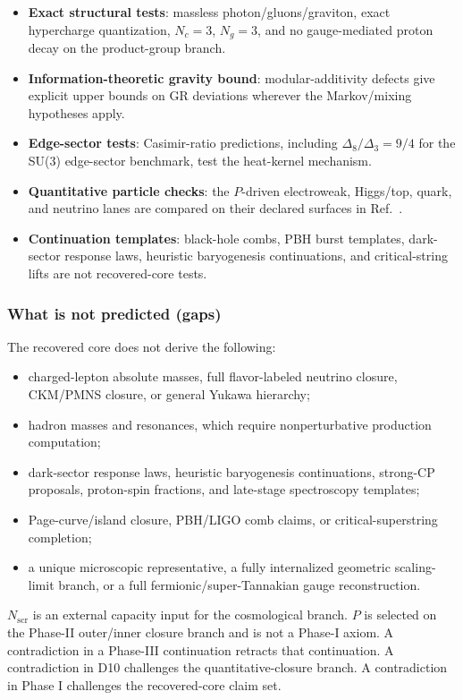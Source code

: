 \begin{itemize}
\tightlist
\item \textbf{Exact structural tests}: massless photon/gluons/graviton, exact hypercharge
quantization, \(N_c=3\), \(N_g=3\), and no gauge-mediated proton decay on the product-group branch.
\item \textbf{Information-theoretic gravity bound}: modular-additivity defects give explicit
upper bounds on GR deviations wherever the Markov/mixing hypotheses apply.
\item \textbf{Edge-sector tests}: Casimir-ratio predictions, including
\(\Delta_8/\Delta_3=9/4\) for the SU(3) edge-sector benchmark, test the heat-kernel mechanism.
\item \textbf{Quantitative particle checks}: the \(P\)-driven electroweak, Higgs/top, quark, and
neutrino lanes are compared on their declared surfaces in Ref.~\cite{ophparticles}.
\item \textbf{Continuation templates}: black-hole combs, PBH burst templates, dark-sector
response laws, heuristic baryogenesis continuations, and critical-string lifts are not recovered-core tests.
\end{itemize}

\subsubsection{What is not predicted (gaps)}\label{84-what-is-not-predicted-gaps}

The recovered core does not derive the following:
\begin{itemize}
\item charged-lepton absolute masses, full flavor-labeled neutrino closure, CKM/PMNS closure, or
general Yukawa hierarchy;
\item hadron masses and resonances, which require nonperturbative production computation;
\item dark-sector response laws, heuristic baryogenesis continuations, strong-CP proposals, proton-spin fractions, and
late-stage spectroscopy templates;
\item Page-curve/island closure, PBH/LIGO comb claims, or critical-superstring completion;
\item a unique microscopic representative, a fully internalized geometric scaling-limit branch,
or a full fermionic/super-Tannakian gauge reconstruction.
\end{itemize}

\(N_{\mathrm{scr}}\) is an external capacity input for the cosmological branch. \(P\) is selected
on the Phase-II outer/inner closure branch and is not a Phase-I axiom. A contradiction in a
Phase-III continuation retracts that continuation. A contradiction in D10 challenges the
quantitative-closure branch. A contradiction in Phase I challenges the recovered-core claim set.


